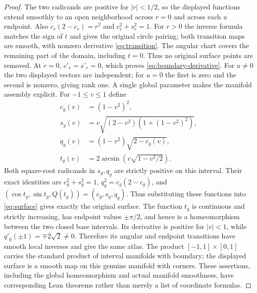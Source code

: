\documentclass[11pt,a4paper]{article}
\theoremstyle{definition}\newtheorem{definition}[theorem]{Definition}
\theoremstyle{remark}\newtheorem{remark}[theorem]{Remark}
\begin{document}
\begin{proof}
The two radicands are positive for $|r|<1/2$, so the displayed functions
extend smoothly to an open neighborhood across $r=0$ and across each
$u$ endpoint. Also $c_r(2-c_r)=r^2$ and $c_r^2+s_r^2=1$.
For $r>0$ the inverse formula matches the sign of $t$ and gives the original
circle pairing; both transition maps are smooth, with nonzero derivative
\eqref{eq:transition}. The angular chart covers the remaining part of the
domain, including $t=0$. Thus no original surface points are removed.
At $r=0$, $c'_r=s'_r=0$, which proves \eqref{eq:boundary-derivative}.
For $u\ne0$ the two displayed vectors are independent; for $u=0$ the
first is zero and the second is nonzero, giving rank one.
A single global parameter makes the manifold assembly explicit. For
$-1\leq v\leq1$ define
\begin{align*}
 c_g(v)&=(1-v^2)^2,\\
 s_g(v)&=v\sqrt{(2-v^2)(1+(1-v^2)^2)},\\
 q_g(v)&=(1-v^2)\sqrt{2-c_g(v)},\\
 t_g(v)&=2\arcsin\!\left(v\sqrt{1-v^2/2}\right).
\end{align*}
Both square-root radicands in $s_g,q_g$ are strictly positive on this
interval. Their exact identities are $c_g^2+s_g^2=1$,
$q_g^2=c_g(2-c_g)$, and $(\cos t_g,\sin t_g,Q(t_g))=(c_g,s_g,q_g)$.
Thus substituting these functions into \eqref{eq:surface} gives exactly
the original surface. The function $t_g$ is continuous and strictly
increasing, has endpoint values $\pm\pi/2$, and hence is a homeomorphism
between the two closed base intervals. Its derivative is positive for
$|v|<1$, while $q'_g(\pm1)=\mp2\sqrt2\ne0$. Therefore its angular and
endpoint transitions have smooth local inverses and give the same atlas.
The product $[-1,1]\times[0,1]$ carries the standard product of interval
manifolds with boundary; the displayed surface is a smooth map on this
genuine manifold with corners. These assertions, including the global
homeomorphism and actual manifold smoothness, have corresponding Lean
theorems rather than merely a list of coordinate formulas.

\end{proof}
\end{document}
